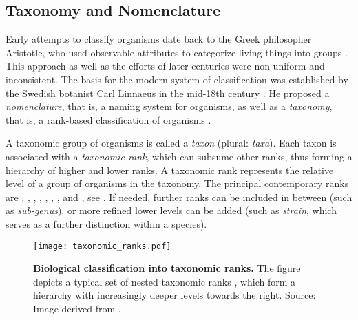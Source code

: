 \subsection{Taxonomy and Nomenclature}
\label{ch:Foundations:sec:TreeOfLife:sub:TaxonomyNomenclature}

Early attempts to classify organisms date back to the Greek philosopher Aristotle,
who used observable attributes to categorize living things into groups \cite{Leroi2014}.
This approach as well as the efforts of later centuries were non-uniform and inconsistent.
The basis for the modern system of classification was established
by the Swedish botanist Carl Linnaeus in the mid-18th century \cite{Donk1957}.
He proposed a \emph{nomenclature}, that is, a naming system for organisms,
as well as a \emph{taxonomy}, that is, a rank-based classification of organisms \cite{Linnaeus1735,Linnaeus1753}.

A taxonomic group of organisms is called a \emph{taxon} (plural: \emph{taxa}).
Each taxon is associated with a \emph{taxonomic rank}, which can subsume other ranks,
thus forming a hierarchy of higher and lower ranks.
A taxonomic rank represents the relative level of a group of organisms in the taxonomy.
The principal contemporary ranks are , , , ,
, , , and ,
see .
If needed, further ranks can be included in between (such as \emph{sub-genus}),
or more refined lower levels can be added (such as \emph{strain}, which serves as a further distinction within a species).

\begin{figure}[hpbt]
    \centering
    \texttt{[image: taxonomic\_ranks.pdf]}
    \caption[Biological classification into taxonomic ranks]{
        \textbf{Biological classification into taxonomic ranks.}
        The figure depicts a typical set of nested taxonomic ranks \cite{Woese1990},
        which form a hierarchy with increasingly deeper levels towards the right.
        Source: Image derived from \cite{Halasz2007}.
    }
    \label{fig:taxonomic_ranks}
\end{figure}

